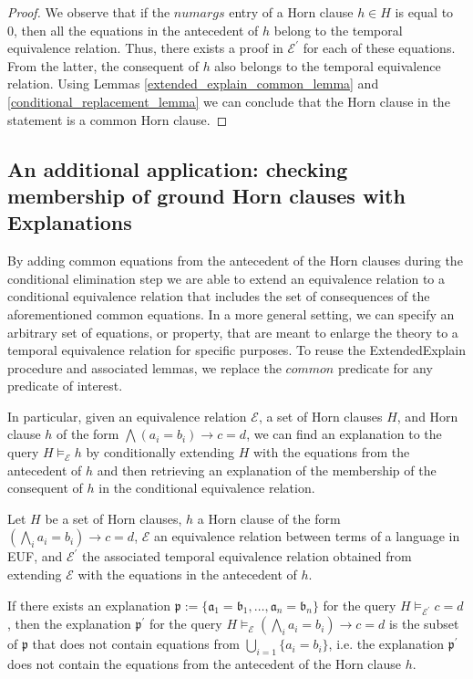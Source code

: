 \begin{proof}
  We observe that if the $numargs$ entry of a Horn clause
  $h \in H$ is equal to 0, then 
  all the equations in the antecedent of $h$ belong 
  to the temporal equivalence relation. Thus, 
  there exists a proof in $\mathcal{E^{'}}$ for
  each of these equations. From the latter, the consequent
  of $h$ also belongs to the temporal equivalence
  relation. Using Lemmas \ref{extended_explain_common_lemma}
  and \ref{conditional_replacement_lemma} we can conclude that
  the Horn clause in the statement is a common Horn clause.
\end{proof}

\subsection{An additional application: checking
  membership of ground Horn clauses 
with Explanations}

By adding common equations
from the antecedent of the Horn clauses during the 
conditional elimination step we are able to 
extend an equivalence relation to a conditional
equivalence relation that includes the set 
of consequences of the aforementioned common equations.
In a more general setting, we can specify an arbitrary
set of equations, or property, 
that are meant to enlarge the theory
to a temporal equivalence relation for 
specific purposes. To reuse the ExtendedExplain
procedure and associated lemmas, we replace the $common$
predicate for any predicate of interest.

In particular, given an equivalence relation 
$\mathcal{E}$, a 
set of Horn clauses $H$, and Horn clause $h$ 
of the form 
$\bigwedge (a_i = b_i) \rightarrow c = d$, we can 
find an explanation to the query 
$H \models_{\mathcal{E}} h$
by conditionally extending $H$ with the equations
from the antecedent of $h$ and then 
retrieving an explanation
of the membership of the consequent 
of $h$ in the conditional 
equivalence relation.

\begin{lemma}
  Let $H$ be a set of Horn clauses, $h$ a 
  Horn clause of the
  form $(\bigwedge_i a_i = b_i) \rightarrow c = d$, 
  $\mathcal{E}$ an equivalence relation between terms 
  of a language in EUF, and $\mathcal{E^{'}}$ the 
  associated temporal equivalence relation 
  obtained from extending
  $\mathcal{E}$ with the equations in the 
  antecedent of $h$.

  If there exists an explanation 
  $\mathfrak{p} := \{\mathfrak{a}_1 = \mathfrak{b}_1,
  \dots, \mathfrak{a}_n = \mathfrak{b}_n\}$ 
  for the query $H \models_{\mathcal{E^{'}}} c = d$,
  then the explanation $\mathfrak{p^{'}}$ for the query 
  $H \models_{\mathcal{E}} (\bigwedge_i a_i = b_i) 
  \rightarrow c = d$ is the subset of $\mathfrak{p}$
  that does not contain equations from 
  $\bigcup_{i=1}\{a_i = b_i\}$, i.e. the 
  explanation $\mathfrak{p^{'}}$ does not contain 
  the equations from the antecedent of the Horn clause
  $h$.

\end{lemma}

